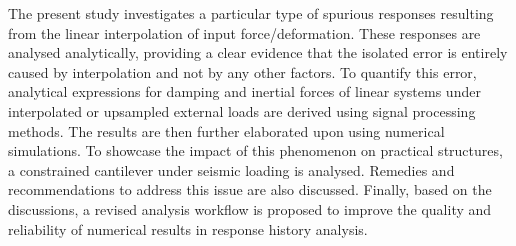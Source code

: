 The present study investigates a particular type of spurious responses resulting from the linear interpolation of input force/deformation. These responses are analysed analytically, providing a clear evidence that the isolated error is entirely caused by interpolation and not by any other factors. To quantify this error, analytical expressions for damping and inertial forces of linear systems under interpolated or upsampled external loads are derived using signal processing methods. The results are then further elaborated upon using numerical simulations. To showcase the impact of this phenomenon on practical structures, a constrained cantilever under seismic loading is analysed. Remedies and recommendations to address this issue are also discussed. Finally, based on the discussions, a revised analysis workflow is proposed to improve the quality and reliability of numerical results in response history analysis.
